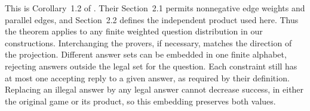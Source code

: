 This is Corollary~1.2 of \cite{DS14}.  Their Section~2.1 permits
nonnegative edge weights and
parallel edges, and Section~2.2 defines the independent product used
here.  Thus the theorem applies to any finite weighted question
distribution in our constructions.  Interchanging the provers, if
necessary, matches the direction of the projection.  Different answer
sets can be embedded in one finite alphabet, rejecting answers outside
the legal set for the question.  Each constraint still has at most one
accepting reply to a given answer, as required by their definition.
Replacing an illegal answer by any legal answer cannot decrease success,
in either the original game or its product, so this embedding preserves
both values.

